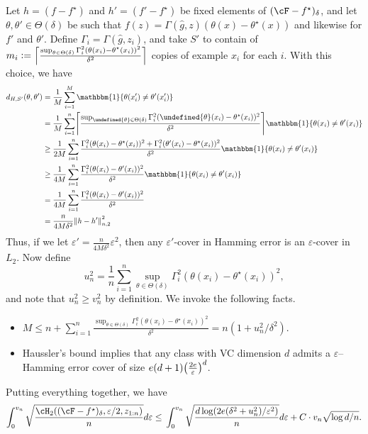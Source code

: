 \documentclass[11pt]{article} %
\theoremstyle{theorem}  %
\theoremstyle{plain}
\DeclarePairedDelimiter{\crl}{\{}{\}}
\DeclarePairedDelimiter{\prn}{(}{)}
\DeclarePairedDelimiter{\nrm}{\|}{\|}
\DeclarePairedDelimiter{\ceil}{\lceil}{\rceil}
\newcommand{\indic}{\mathbbm{1}}    %
\newcommand{\veps}{\varepsilon}
\newcommand{\ldef}{\vcentcolon=}
\newcommand{\wt}[1]{\widetilde{#1}}
\newcommand{\wh}[1]{\widehat{#1}}
\let\wt\undefined
\newcommand{\wt}[1]{\widetilde{#1}}
\newcommand{\estone}{\wh{g}}
\newcommand{\target}{\Theta}
\newcommand{\besttwo}{\theta^{\star}}
\begin{document}
Let $h=(f-f^{\star})$ and $h'=(f'-f^{\star})$ be fixed elements of $(\cF-f^{\star})_{\delta}$, and let $\theta,\theta'\in\target(\delta)$ be such that $f(z)=\Gamma(\estone,z)(\theta(x)-\besttwo(x))$ and likewise for $f'$ and $\theta'$. Define $\Gamma_i = \Gamma(\estone,z_i)$, and take $S'$ to contain of $m_{i}\ldef\ceil*{\frac{\sup_{\theta\in\target(\delta)}\Gamma_i^{2}(\theta(x_i)-\theta^{\star}(x_i))^{2}}{\delta^{2}}}$ copies of example $x_i$ for each $i$. With this choice, we have
\begin{align*}
d_{H,S'}(\theta,\theta')&=\frac{1}{M}\sum_{i=1}^{M}\indic\crl*{\theta(x'_i)\neq{}\theta'(x'_i)} \\
&=\frac{1}{M}\sum_{i=1}^{n}\ceil*{\frac{\sup_{\wt{\theta}\in\target(\delta)}\Gamma_i^{2}(\wt{\theta}(x_i)-\theta^{\star}(x_i))^{2}}{\delta^{2}}}\indic\crl*{\theta(x_i)\neq{}\theta'(x_i)} \\
&\geq\frac{1}{2M}\sum_{i=1}^{n}\frac{\Gamma_i^{2}(\theta(x_i)-\theta^{\star}(x_i))^{2}+ \Gamma_i^{2}(\theta'(x_i)-\theta^{\star}(x_i))^{2}}{\delta^{2}}\indic\crl*{\theta(x_i)\neq{}\theta'(x_i)} \\
&\geq\frac{1}{4M}\sum_{i=1}^{n}\frac{\Gamma_i^{2}(\theta(x_i)-\theta'(x_i))^{2}}{\delta^{2}}\indic\crl*{\theta(x_i)\neq{}\theta'(x_i)} \\
&=\frac{1}{4M}\sum_{i=1}^{n}\frac{\Gamma_i^{2}(\theta(x_i)-\theta'(x_i))^{2}}{\delta^{2}}\\
                        &=\frac{n}{4M\delta^{2}}\nrm*{h-h'}^{2}_{n,2}
\end{align*}
Thus, if we let $\veps'=\frac{n}{4M\delta^{2}}\veps^{2}$, then any $\veps'$-cover in Hamming error is an $\veps$-cover in $L_2$. Now define \[
  u_{n}^{2}=\frac{1}{n}\sum_{i=1}^{n}\sup_{\theta\in\target(\delta)}\Gamma_{i}^{2}(\theta(x_i)-\besttwo(x_i))^{2},\]
and note that $u_n^{2}\geq{}v_{n}^{2}$ by definition. We invoke the following facts.
\begin{itemize}
\item $M\leq{}n+\sum_{i=1}^{n}\frac{\sup_{\theta\in\target(\delta)}\Gamma_i^{2}(\theta(x_i)-\theta^{\star}(x_i))^{2}}{\delta^{2}}=n(1+ u_n^{2}/\delta^{2})$.
\item Haussler's bound \citep{haussler1995sphere} implies that any class with VC dimension $d$ admits a $\veps$--Hamming error cover of size $e(d+1)\prn*{\frac{2e}{\veps}}^{d}$.
\end{itemize}
Putting everything together, we have
\begin{align*}
\int_{0}^{v_n} \sqrt{\frac{\cH_2((\cF-f^{\star})_{\delta}, \veps/2 , z_{1:n})}{n}} d\veps
\leq{}
\int_{0}^{v_n} \sqrt{\frac{d\log(2e(\delta^{2}+u_{n}^{2})/\veps^{2})}{n}} d\veps
+ C\cdot{}v_n\sqrt{\log{}d/n}.
\end{align*}
\end{document}
